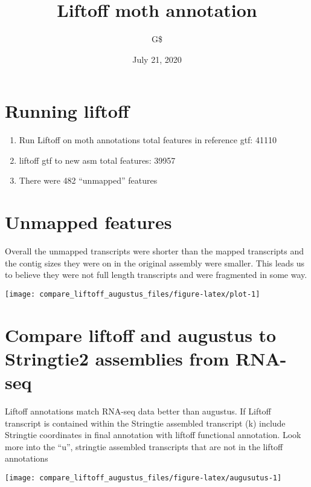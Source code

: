 \documentclass[
]{article}
\title{Liftoff moth annotation}
\author{G\$}
\date{July 21, 2020}
\begin{document}
\maketitle

\hypertarget{running-liftoff}{%
\section{Running liftoff}\label{running-liftoff}}

\begin{enumerate}
\def\labelenumi{\arabic{enumi}.}
\item
  Run Liftoff on moth annotations total features in reference gtf: 41110
\item
  liftoff gtf to new asm total features: 39957
\item
  There were 482 ``unmapped'' features
\end{enumerate}

\hypertarget{unmapped-features}{%
\section{Unmapped features}\label{unmapped-features}}

Overall the unmapped transcripts were shorter than the mapped
transcripts and the contig sizes they were on in the original assembly
were smaller. This leads us to believe they were not full length
transcripts and were fragmented in some way.

\begin{center}\texttt{[image: compare\_liftoff\_augustus\_files/figure-latex/plot-1]} \end{center}
\newpage

\hypertarget{compare-liftoff-and-augustus-to-stringtie2-assemblies-from-rna-seq}{%
\section{Compare liftoff and augustus to Stringtie2 assemblies from
RNA-seq}\label{compare-liftoff-and-augustus-to-stringtie2-assemblies-from-rna-seq}}

Liftoff annotations match RNA-seq data better than augustus. If Liftoff
transcript is contained within the Stringtie assembled transcript (k)
include Stringtie coordinates in final annotation with liftoff
functional annotation. Look more into the ``u'', stringtie assembled
transcripts that are not in the liftoff annotations

\begin{center}\texttt{[image: compare\_liftoff\_augustus\_files/figure-latex/augusutus-1]} \end{center}
\end{document}
